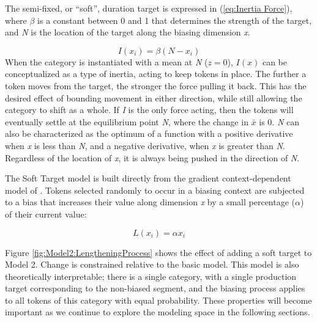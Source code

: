 The semi-fixed, or “soft”, duration target is expressed in (\ref{eq:Inertia Force}),
where $\beta$ is a constant between 0 and 1 that determines the strength
of the target, and \emph{N} is the location of the target along the
biasing dimension \emph{x}. 

\begin{equation}
I(x_{i})=\beta(N-x_{i})\label{eq:Inertia Force}
\end{equation}
When the category is instantiated with a mean at \emph{N} ($z=0$),
$I(x)$ can be conceptualized as a type of inertia, acting to keep
tokens in place. The further a token moves from the target, the stronger
the force pulling it back. This has the desired effect of bounding
movement in either direction, while still allowing the category to
shift as a whole. If \emph{I} is the only force acting, then the tokens
will eventually settle at the equilibrium point \emph{N}, where the
change in \emph{$\bar{x}$} is 0. \emph{N} can also be characterized
as the optimum of a function with a positive derivative when \emph{x}
is less than \emph{N}, and a negative derivative, when \emph{x} is
greater than \emph{N}. Regardless of the location of \emph{x}, it
is always being pushed in the direction of \emph{N}. 

The Soft Target model is built directly from the gradient context-dependent
model of . Tokens selected
randomly to occur in a biasing context are subjected to a bias that
increases their value along dimension \emph{x} by a small percentage
($\alpha$) of their current value: 

\begin{equation}
L(x_{i})=\alpha x_{i}\label{eq:Lengthening Force}
\end{equation}

Figure \ref{fig:Model2:LengtheningProcess} shows the effect of adding
a soft target to Model 2. Change is constrained relative to the basic
model. This model is also theoretically interpretable; there is a
single category, with a single production target corresponding to
the non-biased segment, and the biasing process applies to all tokens
of this category with equal probability. These properties will become
important as we continue to explore the modeling space in the following
sections. 

